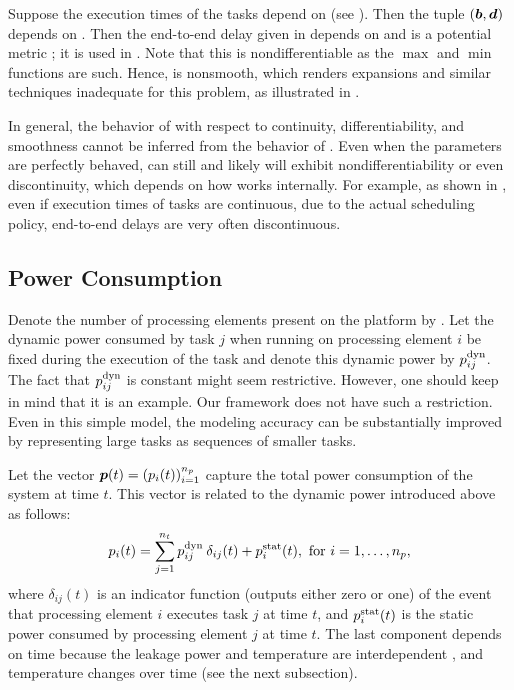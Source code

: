 Suppose the execution times of the tasks depend on \vu (see ).
Then the tuple $(\boldsymbol{b}, \boldsymbol{d})$ depends on \vu. Then the end-to-end delay given
in  depends on \vu and is a potential metric \g; it is
used in . Note that this \g is nondifferentiable as the $\max$ and
$\min$ functions are such. Hence, \g is nonsmooth, which renders 
expansions and similar techniques inadequate for this problem, as illustrated in
.

\begin{remark}
In general, the behavior of \g with respect to continuity, differentiability,
and smoothness cannot be inferred from the behavior of \vu. Even when the
parameters are perfectly behaved, \g can still and likely will exhibit
nondifferentiability or even discontinuity, which depends on how \g works
internally. For example, as shown in \cite{tanasa2015}, even if execution times
of tasks are continuous, due to the actual scheduling policy, end-to-end delays
are very often discontinuous.
\end{remark}

\subsection{Power Consumption}

Denote the number of processing elements present on the platform by \np. Let the
dynamic power consumed by task $j$ when running on processing element $i$ be
fixed during the execution of the task and denote this dynamic power by
$p^{\mathrm{dyn}}_{ij}$. The fact that $p^{\mathrm{dyn}}_{ij}$ is constant might seem
restrictive. However, one should keep in mind that it is an example. Our
framework does not have such a restriction. Even in this simple model, the
modeling accuracy can be substantially improved by representing large tasks as
sequences of smaller tasks.

Let the vector $\boldsymbol{p}(t) = (p_i(t))_{i = 1}^{n_{p}}$ capture the total power
consumption of the system at time $t$. This vector is related to the dynamic
power introduced above as follows:
\[
  p_i(t) = \sum_{j = 1}^{n_{t}} p^{\mathrm{dyn}}_{ij} \: \delta_{ij} (t) + p^{\mathrm{stat}}_i(t), \text{ for $i = 1, \dots, {n_{p}}$},
\]
where $\delta_{ij}(t)$ is an indicator function (outputs either zero or one) of
the event that processing element $i$ executes task $j$ at time $t$, and
$p^{\mathrm{stat}}_i(t)$ is the static power consumed by processing element $j$ at time
$t$. The last component depends on time because the leakage power and
temperature are interdependent \cite{liu2007}, and temperature changes over time
(see the next subsection).

